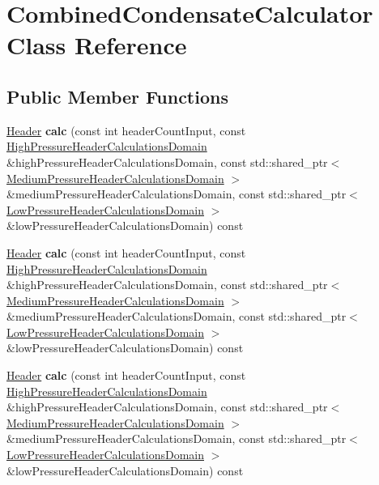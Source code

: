 \hypertarget{class_combined_condensate_calculator}{}\section{Combined\+Condensate\+Calculator Class Reference}
\label{class_combined_condensate_calculator}
\subsection*{Public Member Functions}
\begin{DoxyCompactItemize}
\item 
\mbox{\label{class_combined_condensate_calculator_ac082e80a71e56946848368e4df2849e9}} 
\hyperlink{class_header}{Header} {\bfseries calc} (const int header\+Count\+Input, const \hyperlink{class_high_pressure_header_calculations_domain}{High\+Pressure\+Header\+Calculations\+Domain} \&high\+Pressure\+Header\+Calculations\+Domain, const std\+::shared\+\_\+ptr$<$ \hyperlink{class_medium_pressure_header_calculations_domain}{Medium\+Pressure\+Header\+Calculations\+Domain} $>$ \&medium\+Pressure\+Header\+Calculations\+Domain, const std\+::shared\+\_\+ptr$<$ \hyperlink{class_low_pressure_header_calculations_domain}{Low\+Pressure\+Header\+Calculations\+Domain} $>$ \&low\+Pressure\+Header\+Calculations\+Domain) const
\item 
\mbox{\label{class_combined_condensate_calculator_ac082e80a71e56946848368e4df2849e9}} 
\hyperlink{class_header}{Header} {\bfseries calc} (const int header\+Count\+Input, const \hyperlink{class_high_pressure_header_calculations_domain}{High\+Pressure\+Header\+Calculations\+Domain} \&high\+Pressure\+Header\+Calculations\+Domain, const std\+::shared\+\_\+ptr$<$ \hyperlink{class_medium_pressure_header_calculations_domain}{Medium\+Pressure\+Header\+Calculations\+Domain} $>$ \&medium\+Pressure\+Header\+Calculations\+Domain, const std\+::shared\+\_\+ptr$<$ \hyperlink{class_low_pressure_header_calculations_domain}{Low\+Pressure\+Header\+Calculations\+Domain} $>$ \&low\+Pressure\+Header\+Calculations\+Domain) const
\item 
\mbox{\label{class_combined_condensate_calculator_ac082e80a71e56946848368e4df2849e9}} 
\hyperlink{class_header}{Header} {\bfseries calc} (const int header\+Count\+Input, const \hyperlink{class_high_pressure_header_calculations_domain}{High\+Pressure\+Header\+Calculations\+Domain} \&high\+Pressure\+Header\+Calculations\+Domain, const std\+::shared\+\_\+ptr$<$ \hyperlink{class_medium_pressure_header_calculations_domain}{Medium\+Pressure\+Header\+Calculations\+Domain} $>$ \&medium\+Pressure\+Header\+Calculations\+Domain, const std\+::shared\+\_\+ptr$<$ \hyperlink{class_low_pressure_header_calculations_domain}{Low\+Pressure\+Header\+Calculations\+Domain} $>$ \&low\+Pressure\+Header\+Calculations\+Domain) const
\end{DoxyCompactItemize}


